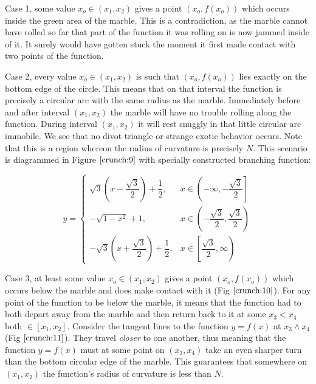 \figuresIII

Case 1, some value $x_o \in (x_1, x_2)$ gives a point $(x_o, f(x_o))$ which occurs inside the green area of the marble. This is a contradiction, as the marble cannot have rolled so far that part of the function it was rolling on is now jammed inside of it. It surely would have gotten stuck the moment it first made contact with two points of the function.

Case 2, every value $x_o \in (x_1, x_2)$ is such that $(x_o, f(x_o))$ lies exactly on the bottom edge of the circle. This means that on that interval the function is precisely a circular arc with the same radius as the marble. Immediately before and after interval $(x_1, x_2)$ the marble will have no trouble rolling along the function. During interval $(x_1, x_2)$ it will rest snuggly in that little circular arc immobile. We see that no divot triangle or strange exotic behavior occurs. Note that this is a region whereon the radius of curvature is precisely $N$. This scenario is diagrammed in Figure $\ref{crunch:9}$ with specially constructed branching function:

\begin{equation*}
  y =
  \begin{cases}
    \sqrt{3} \left( x - \dfrac{\sqrt{3}}{2} \right) + \dfrac{1}{2}, &
    x \in \left( -\infty, - \dfrac{\sqrt{3}}{2} \right]
    \\
    - \sqrt{1 - x^2} + 1, &
    x \in \left( - \dfrac{\sqrt{3}}{2}, \dfrac{\sqrt{3}}{2} \right)
    \\
    - \sqrt{3} \left( x + \dfrac{\sqrt{3}}{2} \right) + \dfrac{1}{2}, &
    x \in \left[ \dfrac{\sqrt{3}}{2}, \infty \right)
  \end{cases}
\end{equation*}

Case 3, at least some value $x_o \in (x_1, x_2)$ gives a point $(x_o, f(x_o))$ which occurs below the marble and does make contact with it (Fig $\ref{crunch:10}$). For any point of the function to be below the marble, it means that the function had to both depart away from the marble and then return back to it at some $x_3 < x_4$ both $\in [x_1, x_2]$. Consider the tangent lines to the function $y = f(x)$ at $x_3 \land x_4$ (Fig $\ref{crunch:11}$). They travel \textit{closer} to one another, thus meaning that the function $y = f(x)$ must at some point on $(x_3, x_4)$ take an even sharper turn than the bottom circular edge of the marble. This guarantees that somewhere on $(x_1, x_2)$ the function’s radius of curvature is less than $N$.

